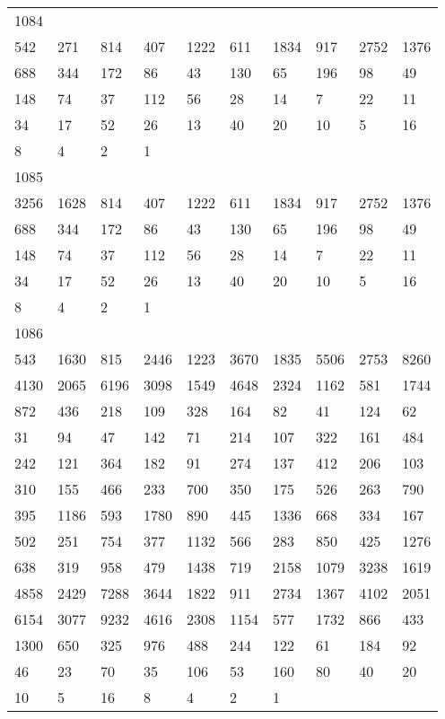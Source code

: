 \begin{longtable}{*{10}{l}}
1084&&&&&&&&&\\
542& 271& 814& 407& 1222& 611& 1834& 917& 2752& 1376\\
688& 344& 172& 86& 43& 130& 65& 196& 98& 49\\
148& 74& 37& 112& 56& 28& 14& 7& 22& 11\\
34& 17& 52& 26& 13& 40& 20& 10& 5& 16\\
8& 4& 2& 1& \\

1085&&&&&&&&&\\
3256& 1628& 814& 407& 1222& 611& 1834& 917& 2752& 1376\\
688& 344& 172& 86& 43& 130& 65& 196& 98& 49\\
148& 74& 37& 112& 56& 28& 14& 7& 22& 11\\
34& 17& 52& 26& 13& 40& 20& 10& 5& 16\\
8& 4& 2& 1& \\

1086&&&&&&&&&\\
543& 1630& 815& 2446& 1223& 3670& 1835& 5506& 2753& 8260\\
4130& 2065& 6196& 3098& 1549& 4648& 2324& 1162& 581& 1744\\
872& 436& 218& 109& 328& 164& 82& 41& 124& 62\\
31& 94& 47& 142& 71& 214& 107& 322& 161& 484\\
242& 121& 364& 182& 91& 274& 137& 412& 206& 103\\
310& 155& 466& 233& 700& 350& 175& 526& 263& 790\\
395& 1186& 593& 1780& 890& 445& 1336& 668& 334& 167\\
502& 251& 754& 377& 1132& 566& 283& 850& 425& 1276\\
638& 319& 958& 479& 1438& 719& 2158& 1079& 3238& 1619\\
4858& 2429& 7288& 3644& 1822& 911& 2734& 1367& 4102& 2051\\
6154& 3077& 9232& 4616& 2308& 1154& 577& 1732& 866& 433\\
1300& 650& 325& 976& 488& 244& 122& 61& 184& 92\\
46& 23& 70& 35& 106& 53& 160& 80& 40& 20\\
10& 5& 16& 8& 4& 2& 1& \\


\end{longtable}
